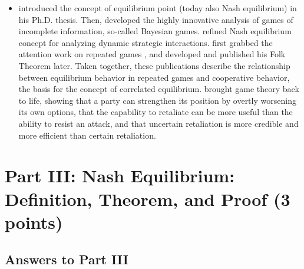 \documentclass[runningheads]{llncs}
\begin{document}
\begin{itemize}


\item 
\href{https://gtl.csa.iisc.ac.in/gametheory/Classics/NCG.pdf}{\textit{\underline{\citet{Nash_1960_theory}}}} introduced the concept of equilibrium point (today also Nash equilibrium) in his Ph.D. thesis. Then, \href{https://www2.cs.siu.edu/~hexmoor/classes/CS491-F10/Harasyani.pdf}{\textit{\underline{\citet{harsanyi_1967_theory}}}}   developed the highly innovative analysis of games of incomplete information, so-called Bayesian games. \href{https://www.degruyter.com/document/doi/10.1515/9781400829460/html}{\textit{\underline{\citeauthor{Selten_1965_theory}}}} refined Nash equilibrium concept for analyzing dynamic strategic interactions\cite{Selten_1965_theory}. 
\href{https://books.google.com/books?hl=zh-CN&lr=&id=rN3TCwAAQBAJ&oi=fnd&pg=PA287&dq=Acceptable+Points+in+General+Cooperative+n-Person+Games&ots=HFiK1tMw25&sig=RNk0Kdf2QYK51HaPmT7ObZwp1Cc#v=onepage&q=Acceptable\%20Points\%20in\%20General\%20Cooperative\%20n-Person\%20Games&f=false}{\textit{\underline{\citeauthor{aumann_1959_theory}}}} first grabbed the attention work on repeated games \cite{aumann_1959_theory}, and developed and published his Folk Theorem later. Taken together, these publications describe the relationship between equilibrium behavior in repeated games and cooperative behavior, the basis for the concept of correlated equilibrium. \href{https://journals.sagepub.com/doi/abs/10.1177/002200275800200301?journalCode=jcrb}{\textit{\underline{\citet{schelling_1980_theory}}}} brought game theory back to life, showing that a party can strengthen its position by overtly worsening its own options, that the capability to retaliate can be more useful than the ability to resist an attack, and that uncertain retaliation is more credible and more efficient than certain retaliation. 

\end{itemize}




\section{Part III: Nash Equilibrium: Definition, Theorem, and Proof (3 points)}

\subsection{Answers to Part III }
\end{document}
